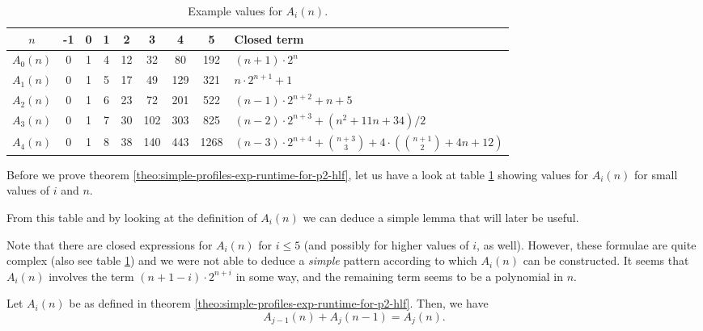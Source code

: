\begin{table}
  \centering
  \begin{tabular}[ht]{ccccccccl}
    $n$ & -1 & 0 & 1 & 2 & 3 & 4 & 5 & Closed term \\
    \hline
    $A_0(n)$ & 0 & 1 & 4 & 12 & 32 & 80 & 192 & 
    $(n+1)\cdot 2^{n}$ \\
    $A_1(n)$ & 0 & 1 & 5 & 17 & 49 & 129 & 321 & 
    $n\cdot 2^{n+1} + 1$ \\
    $A_2(n)$ & 0 & 1 & 6 & 23 & 72 & 201& 522 & 
    $(n-1)\cdot 2^{n+2}+n+5$ \\
    $A_3(n)$ & 0 & 1 & 7 & 30 & 102 & 303 & 825 & 
    $(n-2)\cdot 2^{n+3}+(n^2+11 n+34)/2$ \\
    $A_4(n)$ & 0 & 1 & 8 & 38 & 140 & 443 & 1268 &
    $(n-3)\cdot2^{n+4}+\binom{n+3}{3}+4\cdot\left(\binom{n+1}{2}+4 n+12\right)$ \\
  \end{tabular}
  \caption{Example values for $A_i(n)$. }
  \label{tab:example-values-an-p2-profile}
\end{table}

Before we prove theorem \ref{theo:simple-profiles-exp-runtime-for-p2-hlf}, let us have a look at table \ref{tab:example-values-an-p2-profile} showing values for $A_i(n)$ for small values of $i$ and $n$.

From this table and by looking at the definition of $A_i(n)$ we can deduce a simple lemma that will later be useful.

Note that there are closed expressions for $A_i(n)$ for $i\leq 5$ (and possibly for higher values of $i$, as well). However, these formulae are quite complex (also see table \ref{tab:example-values-an-p2-profile}) and we were not able to deduce a \emph{simple} pattern according to which $A_i(n)$ can be constructed. It seems that $A_i(n)$ involves the term $(n+1-i)\cdot 2^{n+i}$ in some way, and the remaining term seems to be a polynomial in $n$.

\begin{lemma}
  \label{lemma:p2-hlf-profiles-an-simple-recurrence}
  Let $A_i(n)$ be as defined in theorem \ref{theo:simple-profiles-exp-runtime-for-p2-hlf}. Then, we have
  \begin{equation*}
    A_{j-1}(n) + A_{j}(n-1) = A_{j}(n).
  \end{equation*}
\end{lemma}

